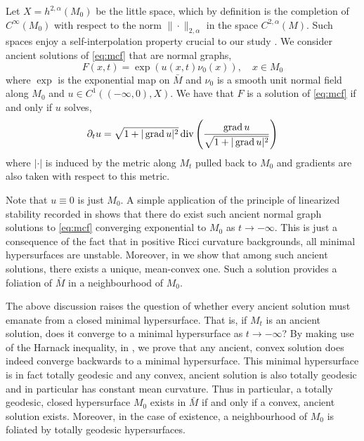 \documentclass{amsart}
\begin{document}
Let \(X = h^{2,\alpha}(M_0)\) be the little \holder{} space, which by definition is the completion of \(C^{\infty}(M_0)\) with respect to the \holder{} norm \(\|\cdot\|_{2,\alpha}\) in the \holder{} space \(C^{2,\alpha}(M)\). Such spaces enjoy a self-interpolation property crucial to our study \cite[Equation 19]{guenther2002stability}. We consider ancient solutions of \eqref{eq:mcf} that are normal graphs,
\[
F(x, t) = \exp(u(x, t) \nu_0(x)), \quad x \in M_0
\]
where \(\exp\) is the exponential map on \(\bar{M}\) and \(\nu_0\) is a smooth unit normal field along \(M_0\) and \(u \in C^1((-\infty, 0), X)\). We have that \(F\) is a solution of \eqref{eq:mcf} if and only if \(u\) solves,
\begin{equation}
\label{eq:graph_mcf}
\partial_t u = \sqrt{1 + |\operatorname{grad} u|^2} \operatorname{div}\left(\frac{\operatorname{grad} u}{\sqrt{1 + |\operatorname{grad} u|^2}}\right)
\end{equation}
where \(|\cdot|\) is induced by the metric along \(M_t\) pulled back to \(M_0\) and gradients are also taken with respect to this metric.

Note that \(u \equiv 0\) is just \(M_0\). A simple application of the principle of linearized stability recorded in  shows that there do exist such ancient normal graph solutions to \eqref{eq:mcf} converging exponential to \(M_0\) as \(t \to - \infty\). This is just a consequence of the fact that in positive Ricci curvature backgrounds, all minimal hypersurfaces are unstable. Moreover, in  we show that among such ancient solutions, there exists a unique, mean-convex one. Such a solution provides a foliation of \(\bar{M}\) in a neighbourhood of \(M_0\).

The above discussion raises the question of whether every ancient solution must emanate from a closed minimal hypersurface. That is, if \(M_t\) is an ancient solution, does it converge to a minimal hypersurface as \(t \to -\infty\)? By making use of the Harnack inequality, in , we prove that any ancient, convex solution does indeed converge backwards to a minimal hypersurface. This minimal hypersurface is in fact totally geodesic and any convex, ancient solution is also totally geodesic and in particular has constant mean curvature. Thus in particular, a totally geodesic, closed hypersurface \(M_0\) exists in \(\bar{M}\) if and only if a convex, ancient solution exists. Moreover, in the case of existence, a neighbourhood of \(M_0\) is foliated by totally geodesic hypersurfaces.
\end{document}
